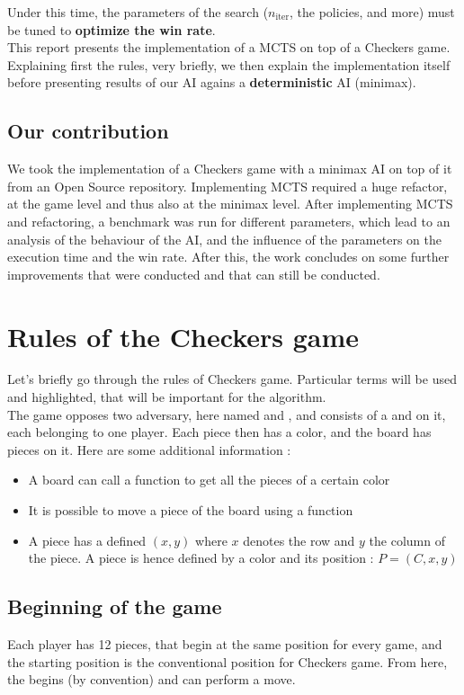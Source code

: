 \documentclass[11pt,a4paper]{article}
\begin{document}
Under this time, the parameters of the search ($n_{\text{iter}}$, the policies, and more) must be tuned to \textbf{optimize the win rate}. \\

This report presents the implementation of a MCTS on top of a Checkers game. Explaining first the rules, very briefly, we then explain the implementation itself before presenting results of our AI agains a \textbf{deterministic} AI (minimax).

\subsection{Our contribution}
We took the implementation of a Checkers game with a minimax AI on top of it from an Open Source repository. Implementing MCTS required a huge refactor, at the game level and thus also at the minimax level. After implementing MCTS and refactoring, a benchmark was run for different parameters, which lead to an analysis of the behaviour of the AI, and the influence of the parameters on the execution time and the win rate. After this, the work concludes on some further improvements that were conducted and that can still be conducted.
\section{Rules of the Checkers game}
Let's briefly go through the rules of Checkers game. Particular terms will be used and highlighted, that will be important for the algorithm. \\

The game opposes two adversary, here named  and , and consists of a  and  on it, each belonging to one player. Each piece then has a color, and the board has pieces on it. Here are some additional information :
\begin{itemize}[label=$\blacktriangleright$]
    \item A board can call a function to get all the pieces of a certain color
    \item It is possible to move a piece of the board using a  function
    \item A piece has a defined  $(x,y)$ where $x$ denotes the row and $y$ the column of the piece. A piece is hence defined by a color and its position : $P = (C, x, y)$
\end{itemize}

\subsection{Beginning of the game}
Each player has 12 pieces, that begin at the same position for every game, and the starting position is the conventional position for Checkers game. From here, the  begins (by convention) and can perform a move.
\end{document}

